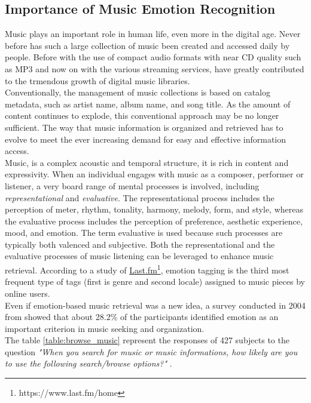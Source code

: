 \subsection{Importance of Music Emotion Recognition}
Music plays an important role in human life, even more in the digital age. Never before has such a large collection of music been created and accessed daily by people. Before with the use of compact audio formats with near CD quality such as MP3 and now on with the various streaming services, have greatly contributed to the trmendous growth of digital music libraries.
\\ \indent
Conventionally, the management of music collections is based on catalog metadata, such as artist name, album name, and song title. As the amount of content continues to explode, this conventional approach may be no longer sufficient. The way that music information is organized and retrieved has to evolve to meet the ever increasing demand for easy and effective information access.
\\ \indent
Music, is a complex acoustic and temporal structure, it is rich in content and expressivity. When an individual engages with music as a composer, performer or listener, a very board range of mental processes is involved, including \textit{representational} and \textit{evaluative}. The representational process includes the perception of meter, rhythm, tonality, harmony, melody, form, and style, whereas the evaluative process includes the perception of preference, aesthetic experience, mood, and emotion. The term evaluative is used because such processes are typically both valenced and subjective. Both the representational and the evaluative processes of music listening can be leveraged to enhance music retrieval.
According to a study of \href{https://www.last.fm/home}{Last.fm}\footnote{https://www.last.fm/home}, emotion tagging is the third most frequent type of tags (first is genre and second locale) assigned to music pieces by online users.
\\ Even if emotion-based music retrieval was a new idea, a survey conducted in 2004 from \cite{lee2004survey} showed that about 28.2\% of the participants identified emotion as an important criterion in music seeking and organization.
\\ The table \ref{table:browse_music} represent the responses of 427 subjects to the question \textit{"When you search for music or music informations, how likely are you to use the following search/browse options?"} \cite{lee2004survey}.

